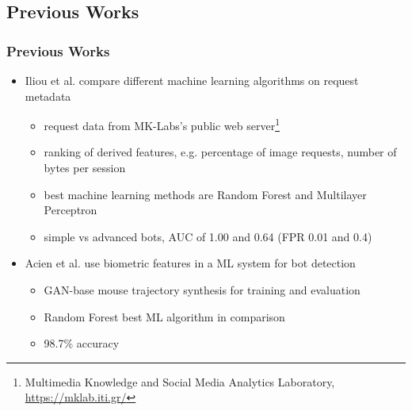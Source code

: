 \documentclass[t,aspectratio=169,table]{beamer}
\begin{document}
\subsection{Previous Works}
\begin{frame}
\frametitle{Previous Works}

\begin{itemize}
    \item Iliou et al. \cite{10.1145/3339252.3339267} compare different machine learning algorithms on request metadata
    \begin{itemize}
        \item request data from MK-Labs's public web server\footnote{Multimedia Knowledge and Social Media Analytics Laboratory, \url{https://mklab.iti.gr/}}
        \item ranking of derived features, e.g. percentage of image requests, number of bytes per session
        \item best machine learning methods are Random Forest and Multilayer Perceptron
        \item simple vs advanced bots, AUC of 1.00 and 0.64 (FPR 0.01 and 0.4)
    \end{itemize}
    \item Acien et al. \cite{Acien2020BeCAPTCHAMouseSM} use biometric features in a ML system for bot detection
    \begin{itemize}
        \item GAN-base mouse trajectory synthesis for training and evaluation
        \item Random Forest best ML algorithm in comparison
        \item 98.7\% accuracy
    \end{itemize}
\end{itemize}

\end{frame}
\end{document}
